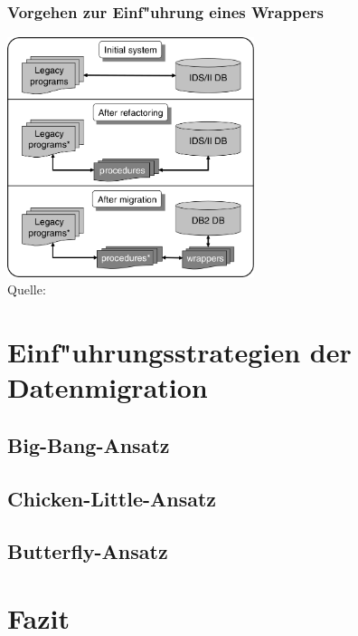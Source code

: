 \documentclass{beamer}
\begin{document}
	\begin{frame}
		\frametitle{Vorgehen zur Einf"uhrung eines Wrappers}
		
		\centering
		\includegraphics[height = 7cm]{../images/large_scale_fig_01.png} \\
		\tiny Quelle: \cite{henrard-2008}
	\end{frame}
	
	\section{Einf"uhrungsstrategien der Datenmigration}
	
	\subsection{Big-Bang-Ansatz}
	
	
	\subsection{Chicken-Little-Ansatz}
	
	
	\subsection{Butterfly-Ansatz}
	
	
	\section{Fazit}
	
\end{document}
